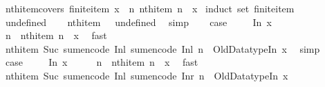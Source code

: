 \begin{isabellebody}
\endisatagproof
{\isafoldproof}%
%
\isadelimproof
\isanewline
%
\endisadelimproof
\isanewline
{}\isamarkupfalse%
\ nth{\isacharunderscore}item{\isacharunderscore}covers{\isacharcolon}\ {\isachardoublequoteopen}finite{\isacharunderscore}item\ x\ {\isasymLongrightarrow}\ {\isasymexists}n{\isachardot}\ nth{\isacharunderscore}item\ n\ {\isacharequal}\ x{\isachardoublequoteclose}\isanewline
%
\isadelimproof
%
\endisadelimproof
%
\isatagproof
{}\isamarkupfalse%
\ {\isacharparenleft}induct\ set{\isacharcolon}\ finite{\isacharunderscore}item{\isacharparenright}\isanewline
\ \ \isamarkupfalse%
\ undefined\isanewline
\ \ \isamarkupfalse%
\ {\isachardoublequoteopen}nth{\isacharunderscore}item\ {}\ {\isacharequal}\ undefined{\isachardoublequoteclose}\ \isamarkupfalse%
\ simp\isanewline
\ \ \isamarkupfalse%
\ {\isacharquery}case\ \isacommand{{\isachardot}{\isachardot}}\isamarkupfalse%
\isanewline
{}\isamarkupfalse%
\isanewline
\ \ \isamarkupfalse%
\ {\isacharparenleft}In{}\ x{\isacharparenright}\isanewline
\ \ \isamarkupfalse%
\ \isamarkupfalse%
\ n\ \ {\isachardoublequoteopen}nth{\isacharunderscore}item\ n\ {\isacharequal}\ x{\isachardoublequoteclose}\ \isamarkupfalse%
\ fast\isanewline
\ \ \isamarkupfalse%
\ {\isachardoublequoteopen}nth{\isacharunderscore}item\ {\isacharparenleft}Suc\ {\isacharparenleft}sum{\isacharunderscore}encode\ {\isacharparenleft}Inl\ {\isacharparenleft}sum{\isacharunderscore}encode\ {\isacharparenleft}Inl\ n{\isacharparenright}{\isacharparenright}{\isacharparenright}{\isacharparenright}{\isacharparenright}\ {\isacharequal}\ Old{\isacharunderscore}Datatype{\isachardot}In{}\ x{\isachardoublequoteclose}\ \isamarkupfalse%
\ simp\isanewline
\ \ \isamarkupfalse%
\ {\isacharquery}case\ \isacommand{{\isachardot}{\isachardot}}\isamarkupfalse%
\isanewline
{}\isamarkupfalse%
\isanewline
\ \ \isamarkupfalse%
\ {\isacharparenleft}In{}\ x{\isacharparenright}\isanewline
\ \ \isamarkupfalse%
\ \isamarkupfalse%
\ n\ \ {\isachardoublequoteopen}nth{\isacharunderscore}item\ n\ {\isacharequal}\ x{\isachardoublequoteclose}\ \isamarkupfalse%
\ fast\isanewline
\ \ \isamarkupfalse%
\ {\isachardoublequoteopen}nth{\isacharunderscore}item\ {\isacharparenleft}Suc\ {\isacharparenleft}sum{\isacharunderscore}encode\ {\isacharparenleft}Inl\ {\isacharparenleft}sum{\isacharunderscore}encode\ {\isacharparenleft}Inr\ n{\isacharparenright}{\isacharparenright}{\isacharparenright}{\isacharparenright}{\isacharparenright}\ {\isacharequal}\ Old{\isacharunderscore}Datatype{\isachardot}In{}\ x{\isachardoublequoteclose}\ \isamarkupfalse%

\end{isabellebody}
